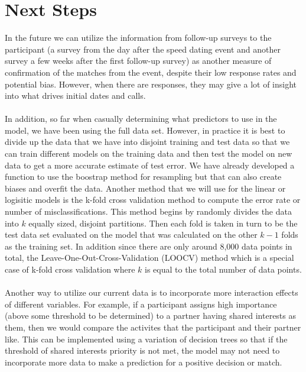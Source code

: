 \documentclass{article}
\begin{document}
\section{Next Steps}
In the future we can utilize the information from follow-up surveys to the participant (a survey from the day after the speed dating event and another survey a few weeks after the first follow-up survey) as another measure of confirmation of the matches from the event, despite their low response rates and potential bias.  However, when there are responses, they may give a lot of insight into what drives initial dates and calls.\\
\null\\
In addition, so far when casually determining what predictors to use in the model, we have been using the full data set.  However, in practice it is best to divide up the data that we have into disjoint training and test data so that we can train different models on the training data and then test the model on new data to get a more accurate estimate of test error.  We have already developed a function to use the boostrap method for resampling but that can also create biases and overfit the data.  Another method that we will use for the linear or logisitic models is the k-fold cross validation method to compute the error rate or number of misclassifications.  This method begins by randomly divides the data into $k$ equally sized, disjoint partitions.  Then each fold is taken in turn to be the test data set evaluated on the model that was calculated on the other $k-1$ folds as the training set.  In addition since there are only around 8,000 data points in total, the Leave-One-Out-Cross-Validation (LOOCV) method which is a special case of k-fold cross validation where $k$ is equal to the total number of data points.\\
\null\\
Another way to utilize our current data is to incorporate more interaction effects of different variables.  For example, if a participant assigns high importance (above some threshold to be determined) to a partner having shared interests as them, then we would compare the activites that the participant and their partner like.  This can be implemented using a variation of decision trees so that if the threshold of shared interests priority is not met, the model may not need to incorporate more data to make a prediction for a positive decision or match.  
\end{document}
